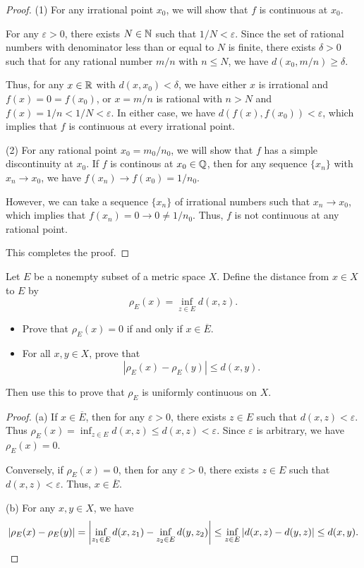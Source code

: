\documentclass{article}
\begin{document}
\begin{proof}
  (1) For any irrational point \( x_0 \), we will show that \( f \) is continuous at \( x_0 \).\par
  For any \( \varepsilon>0 \), there exists \( N\in\mathbb{N} \) such that \( 1/N<\varepsilon \). Since the set of rational numbers with denominator less than or equal to \( N \) is finite, there exists \( \delta>0 \) such that for any rational number \( m/n \) with \( n\le N \), we have \( d(x_0,m/n)\ge\delta \). \par
  Thus, for any \( x\in\mathbb{R} \) with \( d(x,x_0)<\delta \), we have either \( x \) is irrational and \( f(x)=0=f(x_0) \), or \( x=m/n \) is rational with \( n>N \) and \( f(x)=1/n<1/N<\varepsilon \). In either case, we have \( d(f(x),f(x_0))<\varepsilon \), which implies that \( f \) is continuous at every irrational point.\par
  (2) For any rational point \( x_0=m_0/n_0 \), we will show that \( f \) has a simple discontinuity at \( x_0 \). If \( f \) is continous at \( x_0\in\mathbb{Q} \), then for any sequence \( \{x_n\} \) with \( x_n\to x_0 \), we have \( f(x_n)\to f(x_0)=1/n_0 \). \par
  However, we can take a sequence \( \{x_n\} \) of irrational numbers such that \( x_n\to x_0 \), which implies that \( f(x_n)=0\to 0\neq 1/n_0 \). Thus, \( f \) is not continuous at any rational point.\par
  This completes the proof.
\end{proof}



\begin{problem}[4-20]
Let $E$ be a nonempty subset of a metric space $X$. Define the distance from $x\in X$ to $E$ by
\[
\rho_E(x)=\inf_{z\in E} d(x,z).
\]
\begin{itemize}
  \item[(a)] Prove that $\rho_E(x)=0$ if and only if $x\in \overline{E}$.
  \item[(b)] For all $x,y\in X$, prove that
  \[
  \left|\rho_E(x)-\rho_E(y)\right|\le d(x,y).
  \]
\end{itemize}
Then use this to prove that $\rho_E$ is uniformly continuous on $X$.
\end{problem}

\begin{proof}
  (a) If \( x\in\overline{E} \), then for any \( \varepsilon>0 \), there exists \( z\in E \) such that \( d(x,z)<\varepsilon \). Thus \( \rho_E(x)=\inf_{z\in E} d(x,z)\le d(x,z)<\varepsilon \). Since \( \varepsilon \) is arbitrary, we have \( \rho_E(x)=0 \).\par
  Conversely, if \( \rho_E(x)=0 \), then for any \( \varepsilon>0 \), there exists \( z\in E \) such that \( d(x,z)<\varepsilon \). Thus, \( x\in\overline{E} \).\par
  (b) For any \( x,y\in X \), we have
  \[\left|\rho_E(x)-\rho_E(y)\right|=\left|\inf_{z_1\in E}d(x,z_1)-\inf_{z_2\in E}d(y,z_2)\right|\le\inf_{z\in E}\left|d(x,z)-d(y,z)\right|\le d(x,y). \]
\end{proof}
\end{document}
